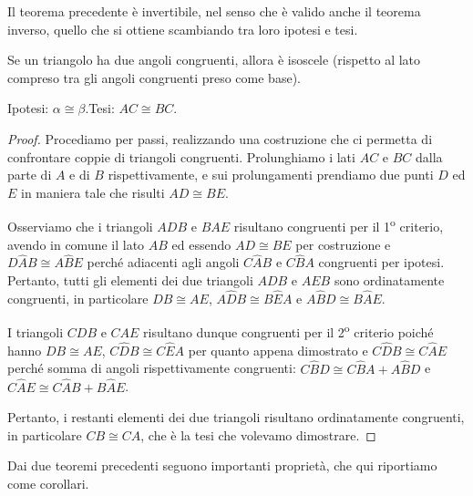 Il teorema precedente è invertibile, nel senso che è valido anche il 
teorema inverso, quello che si ottiene scambiando tra loro ipotesi e 
tesi.

\begin{teorema}
Se un triangolo ha due angoli congruenti, allora è isoscele (rispetto 
al lato compreso tra gli angoli congruenti preso come base).
\end{teorema}


\begin{inaccessibleblock}
 \begin{figure}[htb]
\centering
\end{figure}
\end{inaccessibleblock}

\noindent Ipotesi: $\alpha\cong \beta$.\tab Tesi: $AC\cong BC$.

\begin{proof}
Procediamo per passi, realizzando una costruzione che ci permetta di 
confrontare coppie di triangoli congruenti. Prolunghiamo i lati $AC$ 
e $BC$ dalla parte di $A$ e di $B$ rispettivamente, e sui 
prolungamenti prendiamo due punti $D$ ed $E$ in maniera tale che 
risulti $AD\cong BE$.

Osserviamo che i triangoli $ADB$ e $BAE$ risultano congruenti per il 
1\textsuperscript{o} criterio, avendo in comune il lato $AB$ ed 
essendo $AD\cong BE$ per costruzione e $D\widehat{A}B\cong 
A\widehat{B}E$ perché adiacenti agli angoli $C\widehat{A}B$ e 
$C\widehat{B}A$ congruenti per ipotesi. Pertanto, tutti gli elementi 
dei due triangoli $ADB$ e $AEB$ sono ordinatamente congruenti, in 
particolare $DB\cong AE$, $A\widehat{D}B\cong B\widehat{E}A$ e 
$A\widehat{B}D\cong B\widehat{A}E$.

I triangoli $CDB$ e $CAE$ risultano dunque congruenti per il 
2\textsuperscript{o} criterio poiché hanno $DB\cong AE$, 
$C\widehat{D}B\cong C\widehat{E}A$ per quanto appena dimostrato e 
$C\widehat{D}B\cong C\widehat{A}E$ perché somma di angoli 
rispettivamente congruenti: $C\widehat{B}D\cong C\widehat{B}A + 
A\widehat{B}D$ e $C\widehat{A}E\cong C\widehat{A}B + B\widehat{A}E$.

Pertanto, i restanti elementi dei due triangoli risultano 
ordinatamente congruenti, in particolare $CB\cong CA$, che è la tesi 
che volevamo dimostrare.
\end{proof}


Dai due teoremi precedenti seguono importanti proprietà, che qui 
riportiamo come corollari.

